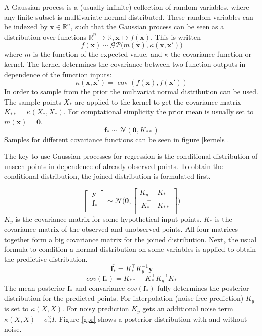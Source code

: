 \documentclass[english]{article}
\newcommand{\x}{\mathbf{x}}
\begin{document}
A Gaussian process is a (usually infinite) collection of random variables, where any finite subset is multivariate normal distributed. These random variables can be indexed by $\x \in \mathbb{R}^n$, such that the Gaussian process can be seen as a distribution over functions $\mathbb{R}^n \rightarrow \mathbb{R}, \x \mapsto f(\x)$. This is written
\begin{equation}
f(\mathbf{x}) \sim \mathcal{GP}\big(m(\mathbf{x}), \kappa(\mathbf{x},\mathbf{x}')\big)
\end{equation}
where $m$ is the function of the expected value, and $\kappa$ the covariance function or kernel. The kernel determines the covariance between two function outputs in dependence of the function inputs:
\begin{equation}
\kappa(\mathbf{x},\mathbf{x}') = \operatorname{cov}(f(\mathbf{x}),f(\mathbf{x}'))
\end{equation}
In order to sample from the prior the multvariat normal distribution can be used. The sample points $X_*$ are applied to the kernel to get the covariance matrix $K_{**} = \kappa(X_*,X_*)$. For comptational simplicity the prior mean is usually set to $m(\mathbf{x}) = \mathbf{0}$.
$$\mathbf{f_*} \sim \mathcal{N}(\mathbf{0}, K_{**})$$
Samples for different covariance functions can be seen in figure \ref{kernels}.

The key to use Gaussian processes for regression is the conditional distribution of unseen points in dependence of already observed points.
To obtain the conditional distribution, the joined distribution is formulated first.

$$
\begin{bmatrix}
\ \mathbf{y}\ \\
\ \mathbf{f_*} \\
\end{bmatrix}
\sim \mathcal{N} \Bigg(\mathbf{0},
\begin{bmatrix}
K_y & K_* \\
\ K^{\top}_{*} & K_{**}  \\
\end{bmatrix}
\Bigg)
$$
$K_y$ is the covariance matrix for some hypothetical input points. $K_*$ is the covariance matrix of the observed and unobserved points. All four matrices together form a big covariance matrix for the joined distribution. Next, the usual formula to condition a normal distribution on some variables is applied to obtain the predictive distribution.
$$\overline{\mathbf{f_*}} = K_*^\top K_y^{-1}\mathbf{y}$$
$$cov(\mathbf{f_*}) = K_{**} - K_*^\top K_y^{-1} K_*$$
The mean posterior $\overline{\mathbf{f_*}}$ and convariance $cov(\mathbf{f_*})$ fully determines the posterior distribution for the predicted points. For interpolation (noise free prediction) $K_y$ is set to  $\kappa(X,X)$. For noisy prediction $K_y$ gets an additional noise term $\kappa(X,X) + \sigma_n^2I$. Figure \ref{gpr} shows a posterior distribution with and without noise.
\end{document}
